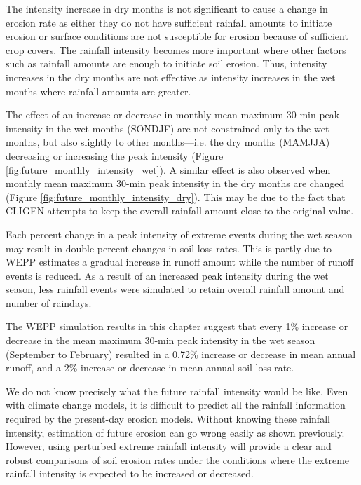 The intensity increase in dry months is not significant to cause a change in
erosion rate as either they do not have sufficient rainfall amounts to initiate
erosion or surface conditions are not susceptible for erosion because of
sufficient crop covers. The rainfall intensity becomes more important where
other factors such as rainfall amounts are enough to initiate soil erosion.
Thus, intensity increases in the dry months are not effective as intensity
increases in the wet months where rainfall amounts are greater.

The effect of an increase or decrease in monthly mean maximum 30-min peak
intensity in the wet months (SONDJF) are not constrained only to the wet months,
but also slightly to other months---i.e. the dry months (MAMJJA) decreasing or
increasing the peak intensity (Figure \ref{fig:future_monthly_intensity_wet}). A
similar effect is also observed when monthly mean maximum 30-min peak intensity
in the dry months are changed (Figure \ref{fig:future_monthly_intensity_dry}).
This may be due to the fact that CLIGEN attempts to keep the overall rainfall
amount close to the original value.

Each percent change in a peak intensity of extreme events during the wet season
may result in double percent changes in soil loss rates. This is partly due to
WEPP estimates a gradual increase in runoff amount while the number of runoff
events is reduced. As a result of an increased peak intensity during the wet
season, less rainfall events were simulated to retain overall rainfall amount
and number of raindays.

The WEPP simulation results in this chapter suggest that every 1\% increase or
decrease in the mean maximum 30-min peak intensity in the wet season (September
to February) resulted in a 0.72\% increase or decrease in mean annual runoff,
and a 2\% increase or decrease in mean annual soil loss rate.

We do not know precisely what the future rainfall intensity would be like. Even
with climate change models, it is difficult to predict all the rainfall
information required by the present-day erosion models. Without knowing these
rainfall intensity, estimation of future erosion can go wrong easily as shown
previously.
However, using perturbed extreme rainfall intensity will provide a clear and
robust comparisons of soil erosion rates under the conditions where the extreme
rainfall intensity is expected to be increased or decreased.


